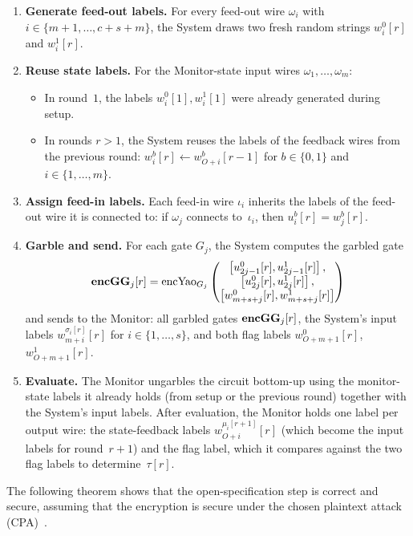 \begin{enumerate}
    \item \textbf{Generate feed-out labels.} For every feed-out wire $\omega_i$ with $i \in \{m{+}1,\ldots,c{+}s{+}m\}$, the System draws two fresh random strings $w_i^0[r]$ and $w_i^1[r]$.
    \item \textbf{Reuse state labels.} For the Monitor-state input wires $\omega_1,\ldots,\omega_m$:
        \begin{itemize}
            \item In round~$1$, the labels $w_i^0[1], w_i^1[1]$ were already generated during setup.
            \item In rounds $r > 1$, the System reuses the labels of the feedback wires from the previous round: $w_i^b[r] \gets w_{O+i}^b[r{-}1]$ for $b \in \{0,1\}$ and $i \in \{1,\ldots,m\}$.
        \end{itemize}
    \item \textbf{Assign feed-in labels.} Each feed-in wire $\iota_i$ inherits the labels of the feed-out wire it is connected to: if $\omega_j$ connects to~$\iota_i$, then $u_i^b[r] = w_j^b[r]$.
    \item \textbf{Garble and send.} For each gate $G_j$, the System computes the garbled gate
    \[
      \textbf{encGG}_j[r] = \text{encYao}_{G_j} \begin{pmatrix}
         \left[u_{2j-1}^0[r], u_{2j-1}^1[r]\right], \\
         \left[u_{2j}^0[r], u_{2j}^1[r]\right], \\
         \left[w_{m+s+j}^0[r],   w_{m+s+j}^1[r]\right]
      \end{pmatrix}
    \]
    and sends to the Monitor: all garbled gates $\textbf{encGG}_j[r]$, the System's input labels $w_{m+i}^{\sigma_i[r]}[r]$ for $i \in \{1,\ldots,s\}$, and both flag labels $w_{O+m+1}^0[r]$, $w_{O+m+1}^1[r]$.
    \item \textbf{Evaluate.} The Monitor ungarbles the circuit bottom-up using the monitor-state labels it already holds (from setup or the previous round) together with the System's input labels. After evaluation, the Monitor holds one label per output wire: the state-feedback labels $w_{O+i}^{\mu_i[r+1]}[r]$ (which become the input labels for round~$r{+}1$) and the flag label, which it compares against the two flag labels to determine~$\tau[r]$.
\end{enumerate}

The following theorem shows that the open-specification step is correct and secure, assuming that the encryption is secure under the chosen plaintext attack (CPA)~\cite{Bir11}.

